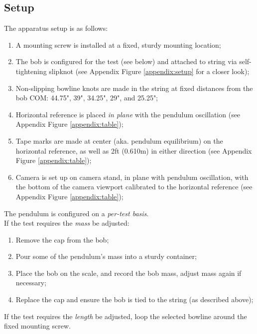 \documentclass[12pt]{article}
\begin{document}
\subsection{Setup}
\label{section:setup}
\noindent
The apparatus setup is as follows:

\begin{enumerate}
    \item A mounting screw is installed at a fixed, sturdy mounting location;
    \item The bob is configured for the test (see below) and attached to string via self-tightening slipknot (see Appendix Figure \ref{appendix:setup} for a closer look);
    \item Non-slipping bowline knots are made in the string at fixed distances from the bob COM: 44.75", 39", 34.25", 29", and 25.25";
    \item Horizontal reference is placed \emph{in plane} with the pendulum oscillation (see Appendix Figure \ref{appendix:table});
    \item Tape marks are made at center (aka. pendulum equilibrium) on the horizontal reference, as well as 2ft (0.610m) in either direction (see Appendix Figure \ref{appendix:table});
    \item Camera is set up on camera stand, in plane with pendulum oscillation, with the bottom of the camera viewport calibrated to the horizontal reference (see Appendix Figure \ref{appendix:table});
\end{enumerate}
\pagebreak
\noindent
The pendulum is configured on a \emph{per-test basis}.\\

If the test requires the \emph{mass} be adjusted:
\begin{enumerate}
    \item Remove the cap from the bob;
    \item Pour some of the pendulum's mass into a sturdy container;
    \item Place the bob on the scale, and record the bob mass, adjust mass again if necessary;
    \item Replace the cap and ensure the bob is tied to the string (as described above);
\end{enumerate}
\noindent
If the test requires the \emph{length} be adjusted, loop the selected bowline around the fixed mounting screw.
\end{document}
